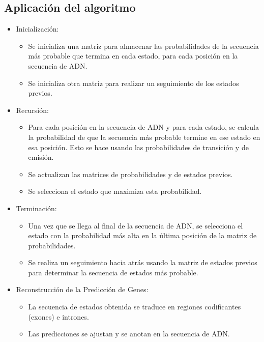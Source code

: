 \documentclass[11pt,openany]{book}
\begin{document}
\subsection*{Aplicación del algoritmo}
\begin{itemize}
      \item Inicialización:
      \begin{itemize}
            \item Se inicializa una matriz para almacenar las probabilidades de la secuencia más probable que termina en cada estado, para cada posición en la secuencia de ADN.
            \item Se inicializa otra matriz para realizar un seguimiento de los estados previos.
      \end{itemize}
      \item Recursión:
      \begin{itemize}
            \item Para cada posición en la secuencia de ADN y para cada estado, se calcula la probabilidad de que la secuencia más probable termine en ese estado en esa posición. Esto se hace usando las probabilidades de transición y de emisión.
            \item Se actualizan las matrices de probabilidades y de estados previos.
            \item Se selecciona el estado que maximiza esta probabilidad.
      \end{itemize}
      \item Terminación:
      \begin{itemize}
            \item Una vez que se llega al final de la secuencia de ADN, se selecciona el estado con la probabilidad más alta en la última posición de la matriz de probabilidades.
            \item Se realiza un seguimiento hacia atrás usando la matriz de estados previos para determinar la secuencia de estados más probable.
      \end{itemize}
      \item Reconstrucción de la  Predicción de Genes:
      \begin{itemize}
            \item La secuencia de estados obtenida se traduce en regiones codificantes (exones) e intrones.
            \item Las predicciones se ajustan y se anotan en la secuencia de ADN.

      \end{itemize}
\end{itemize}
\end{document}
